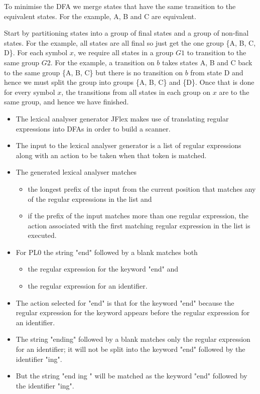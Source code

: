 To minimise the DFA we merge states that have the same
transition to the equivalent states. For the example, A, B and C
are equivalent.


Start by partitioning states into a group of final states and a group of non-final states. For the example, all states are all final so just get the one group \{A, B, C, D\}.
For each symbol $x$, we require all states in a group $G1$ to transition to the same group $G2$. For the example, a transition on $b$ takes states A, B and C back to the same group \{A, B, C\} but there is no transition on $b$ from state D and hence we must split the group into groups \{A, B, C\} and \{D\}.
Once that is done for every symbol $x$, the transitions from all states in each group on $x$ are to the same group, and hence we have finished.


\begin{itemize}
    \item The lexical analyser generator JFlex makes use of translating regular expressions into DFAs in order to build a scanner.
    \item The input to the lexical analyser generator is a list of regular expressions along with an action to be taken when that token is matched.
    \item The generated lexical analyser matches
    \begin{itemize}
        \item the longest prefix of the input from the current position that matches any of the regular expressions in the list and
        \item if the prefix of the input matches more than one regular expression, the action associated with the first matching regular expression in the list is executed.
    \end{itemize}
\end{itemize}


\begin{itemize}
    \item For PL0 the string "end" followed by a blank matches both
    \begin{itemize}
        \item the regular expression for the keyword "end" and
        \item the regular expression for an identifier.
    \end{itemize}
    \item The action selected for "end" is that for the keyword "end" because the regular expression for the keyword appears before the regular expression for an identifier.
    \item The string "ending" followed by a blank matches only the regular expression for an identifier; it will not be split into the keyword "end" followed by the identifier "ing".
    \item But the string "end ing " will be matched as the keyword "end" followed by the identifier "ing".
\end{itemize}